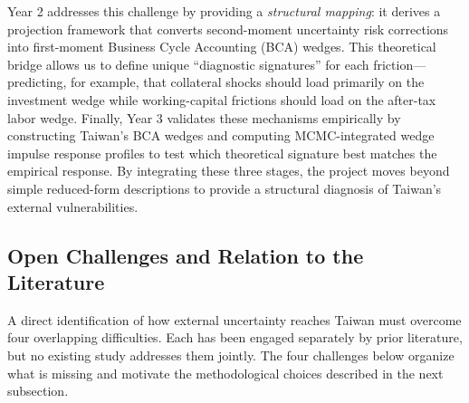 \documentclass[12pt]{article}
\begin{document}
Year 2 addresses this challenge by providing a \emph{structural mapping}: it derives a projection framework that converts second-moment uncertainty risk corrections into first-moment Business Cycle Accounting (BCA) wedges. This theoretical bridge allows us to define unique ``diagnostic signatures'' for each friction---predicting, for example, that collateral shocks should load primarily on the investment wedge while working-capital frictions should load on the after-tax labor wedge. Finally, Year 3 validates these mechanisms empirically by constructing Taiwan's BCA wedges and computing MCMC-integrated wedge impulse response profiles to test which theoretical signature best matches the empirical response. By integrating these three stages, the project moves beyond simple reduced-form descriptions to provide a structural diagnosis of Taiwan's external vulnerabilities.

\subsection{Open Challenges and Relation to the Literature}

A direct identification of how external uncertainty reaches Taiwan must overcome four overlapping difficulties. Each has been engaged separately by prior literature, but no existing study addresses them jointly. The four challenges below organize what is missing and motivate the methodological choices described in the next subsection.
\end{document}

